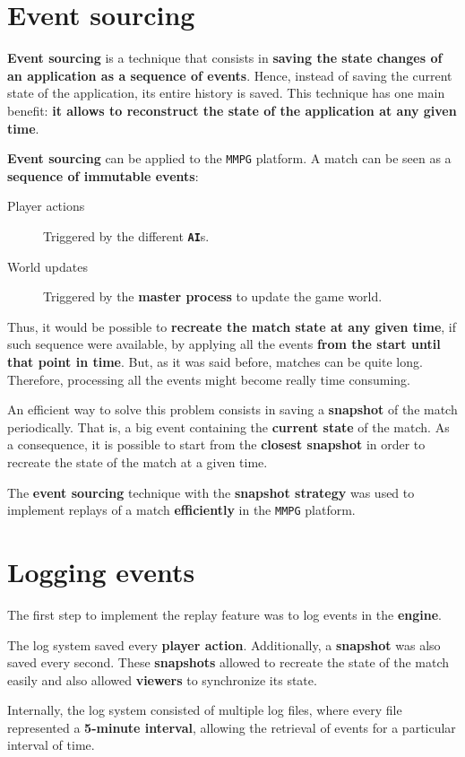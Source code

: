 \documentclass[a4paper,11pt,titlepage,abstract,numbers=noenddot,automark,mnsy,intlimits,rgb,dvipsnames]{report}
\begin{document}
\section{Event sourcing}
\textbf{Event sourcing} \cite{event_sourcing} is a technique that consists in \textbf{saving the state changes of an application as a
sequence of events}. Hence, instead of saving the current state of the application, its entire history is saved. This technique
has one main benefit: \textbf{it allows to reconstruct the state of the application at any given time}.

\textbf{Event sourcing} can be applied to the \texttt{MMPG} platform. A match can be seen as a \textbf{sequence of immutable events}:
\begin{description}
\item[Player actions]
Triggered by the different \textbf{\texttt{AI}}s.
\item[World updates]
Triggered by the \textbf{master process} to update the game world.
\end{description}
Thus, it would be possible to \textbf{recreate the match state at any given time}, if such sequence were available, by applying
all the events \textbf{from the start until that point in time}. But, as it was said before, matches can be quite long. Therefore,
processing all the events might become really time consuming.

An efficient way to solve this problem consists in saving a \textbf{snapshot} of the match periodically. That is, a big event
containing the \textbf{current state} of the match. As a consequence, it is possible to start from the \textbf{closest snapshot} in order
to recreate the state of the match at a given time.

The \textbf{event sourcing} technique with the \textbf{snapshot strategy} was used to implement replays of a match \textbf{efficiently} in
the \texttt{MMPG} platform.
\section{Logging events}
The first step to implement the replay feature was to log events in the \textbf{engine}.

The log system saved every \textbf{player action}. Additionally, a \textbf{snapshot} was also saved every second.
These \textbf{snapshots} allowed to recreate the state of the match easily and also allowed \textbf{viewers} to synchronize its state.

Internally, the log system consisted of multiple log files, where every file represented a \textbf{5-minute interval}, allowing the
retrieval of events for a particular interval of time.
\end{document}
